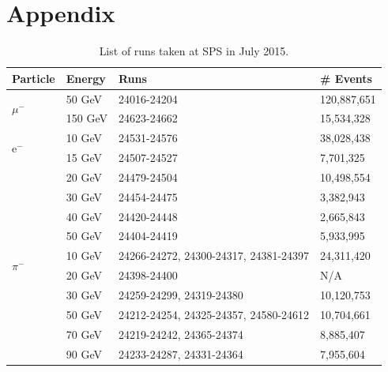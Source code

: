 \documentclass{JINST}
\begin{document}



% 

\clearpage

\appendix
\section{Appendix}
\label{appendix:Additional}
\setcounter{table}{0}
\renewcommand{\thetable}{A\arabic{table}}

\begin{table}[htb!]
  \centering
  \caption{List of runs taken at SPS in July 2015.}
  \label{table:dataruns}
  \begin{tabular}{@{}lp{2cm}p{7.5cm}p{2cm}@{}}
    \toprule
    \multicolumn{1}{l}{\textbf{Particle}} & \textbf{Energy} & \textbf{Runs} & \textbf{\# Events}\\
    \midrule
    \multirow{2}{*}{$\mu^-$}& 50 GeV & 24016-24204 & 120,887,651\\& 150 GeV & 24623-24662 & 15,534,328\\
    \midrule
    \multirow{2}{*}{e$^-$}& 10 GeV & 24531-24576 & 38,028,438\\& 15 GeV & 24507-24527 & 7,701,325\\& 20 GeV & 24479-24504 & 10,498,554\\& 30 GeV & 24454-24475 & 3,382,943\\& 40 GeV & 24420-24448 & 2,665,843\\& 50 GeV & 24404-24419 & 5,933,995\\
    \midrule
    \multirow{2}{*}{$\pi^-$}& 10 GeV & 24266-24272, 24300-24317, 24381-24397 & 24,311,420\\& 20 GeV & 24398-24400 & N/A\footnotemark\\& 30 GeV & 24259-24299, 24319-24380 & 10,120,753\\& 50 GeV & 24212-24254, 24325-24357, 24580-24612 & 10,704,661\\& 70 GeV & 24219-24242, 24365-24374 & 8,885,407\\& 90 GeV & 24233-24287, 24331-24364 & 7,955,604\\
    \bottomrule
  \end{tabular}
\end{table}
\end{document}

